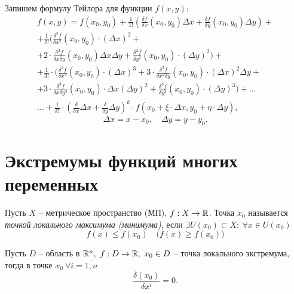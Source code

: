 \begin{example}
    Запишем формулу Тейлора для функции $f(x,y)$:
    \begin{multline*}
        f(x,y) = f(x_0,y_0) + \frac{1}{1!}\left(\frac{\delta f}{\delta x}(x_0,y_0)\Delta x + \frac{\delta f}{\delta y}(x_0,y_0)\Delta y\right) + \\
        + \frac{1}{2!}\bigg(\frac{\delta^2f}{\delta x^2}(x_0,y_0)\cdot (\Delta x)^2 + \\
        + 2 \cdot \frac{\delta^2f}{\delta x \delta y}(x_0,y_0)\Delta x\Delta y + \frac{\delta^2f}{\delta y^2}(x_0,y_0)\cdot(\Delta y)^2\bigg) +\\
        + \frac{1}{3!}\cdot \bigg(\frac{\delta^3f}{\delta x^3}(x_0,y_0) \cdot (\Delta x)^3 + 3 \cdot \frac{\delta^3f}{\delta x^2\delta y}(x_0, y_0) \cdot (\Delta x)^2\Delta y + \\
        + 3\cdot\frac{\delta^3f}{\delta x\delta y^2}(x_0,y_0)\cdot \Delta x(\Delta y)^2 + \frac{\delta^3f}{\delta y^3}(x_0,y_0)\cdot(\Delta y)^3\bigg) + \ldots \\
        \ldots + \frac{1}{k!}\cdot\left(\frac{\delta}{\delta x}\Delta x + \frac{\delta}{\delta y}\Delta y\right)^k \cdot f(x_0 + \xi \cdot \Delta x, y_0 + \eta \cdot \Delta y),
    \end{multline*}
    \[
        \Delta x = x - x_0, \quad \Delta y = y - y_0.
    \]
\end{example}

\section{Экстремумы функций многих переменных}

\begin{definition}
    Пусть $ X $ -- метрическое пространство (МП), $ f:X \rightarrow\mathbb{R} $. Точка $ x_0 $ называется \emph{точкой локального максимума (минимума)}, если $ \exists U(x_0) \subset X: \ \forall x \in U(x_0) $
    \[
        f(x)\leqslant f(x_0) \quad \big(f(x) \geqslant f(x_0)\big)
    \]
\end{definition}

\begin{theorem}
    Пусть $D$ -- область в $ \mathbb{R}^n, \ f:D \rightarrow\mathbb{R}, \ x_0 \in D $ -- точка локального экстремума, тогда в точке $ x_0 \ \forall i = \overline{1,n}$
    \[
        \frac{\delta(x_0)}{\delta x^i} = 0.
    \]
\end{theorem}

